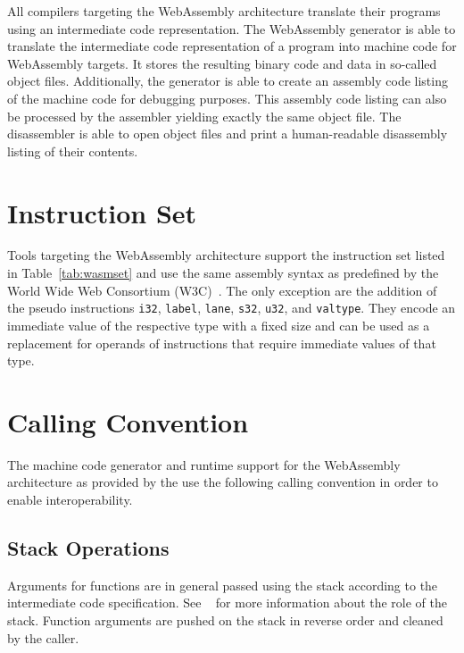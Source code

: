 All compilers targeting the WebAssembly architecture translate their programs using an intermediate code representation.
The WebAssembly generator is able to translate the intermediate code representation of a program into machine code for WebAssembly targets.
It stores the resulting binary code and data in so-called object files.
Additionally, the generator is able to create an assembly code listing of the machine code for debugging purposes.
This assembly code listing can also be processed by the assembler yielding exactly the same object file.
The disassembler is able to open object files and print a human-readable disassembly listing of their contents.
\seeobject\seecode

\section{Instruction Set}

Tools targeting the WebAssembly architecture support the instruction set listed in Table~\ref{tab:wasmset} and use the same assembly syntax as predefined by the World Wide Web Consortium (W3C)~\cite{wasm:instructionset}.
The only exception are the addition of the pseudo instructions \texttt{i32}, \texttt{label}, \texttt{lane}, \texttt{s32}, \texttt{u32}, and \texttt{valtype}.
They encode an immediate value of the respective type with a fixed size and can be used as a replacement for operands of instructions that require immediate values of that type.
\seeassembly


\section{Calling Convention}

The machine code generator and runtime support for the WebAssembly architecture as provided by the \ecs{} use the following calling convention in order to enable interoperability.

\subsection{Stack Operations}

Arguments for functions are in general passed using the stack according to the intermediate code specification.
See \Documentation{}~ for more information about the role of the stack.
Function arguments are pushed on the stack in reverse order and cleaned by the caller.

